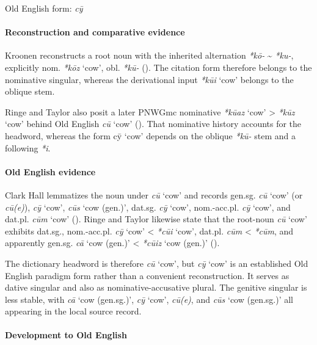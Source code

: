 \documentclass[
  british,
  a4paper,
]{article}
\providecommand{\Recon}[1]{\emph{*#1}}
\begin{document}
Old English form: \emph{cȳ}

\paragraph{Reconstruction and comparative
evidence}\label{reconstruction-and-comparative-evidence-120}

Kroonen reconstructs a root noun with the inherited alternation
\emph{*kō-} \textasciitilde{} \emph{*ku-}, explicitly nom.
\emph{\Recon{kōz}} `cow', obl. \emph{*kū-}
(). The citation form
therefore belongs to the nominative singular, whereas the derivational
input \Recon{kūi} `cow' belongs to the oblique stem.

Ringe and Taylor also posit a later PNWGmc nominative \Recon{kūaz} `cow'
\textgreater{} \Recon{kūz} `cow' behind Old English {\emph{cū}} `cow'
().
That nominative history accounts for the headword, whereas the form cȳ
`cow' depends on the oblique \emph{*kū-} stem and a following \emph{*i}.

\paragraph{Old English evidence}\label{old-english-evidence-120}

Clark Hall lemmatizes the noun under {\emph{cū}} `cow' and records
gen.sg. {\emph{cū}} `cow' (or {\emph{cū(e)}}), {\emph{cȳ}} `cow',
{\emph{cūs}} `cow (gen.)', dat.sg. {\emph{cȳ}} `cow', nom.-acc.pl.
{\emph{cȳ}} `cow', and dat.pl. \emph{cūm} `cow'
(). Ringe and Taylor
likewise state that the root-noun {\emph{cū}} `cow' exhibits dat.sg.,
nom.-acc.pl. {\emph{cȳ}} `cow' \textless{} \Recon{cūi} `cow', dat.pl.
\emph{cūm} \textless{} \emph{*cūm}, and apparently gen.sg. {\emph{cā}}
`cow (gen.)' \textless{} \Recon{cūiz} `cow (gen.)'
().

The dictionary headword is therefore {\emph{cū}} `cow', but {\emph{cȳ}}
`cow' is an established Old English paradigm form rather than a
convenient reconstruction. It serves as dative singular and also as
nominative-accusative plural. The genitive singular is less stable, with
{\emph{cā}} `cow (gen.sg.)', {\emph{cȳ}} `cow', \emph{cū(e)}, and
{\emph{cūs}} `cow (gen.sg.)' all appearing in the local source record.

\paragraph{Development to Old
English}\label{development-to-old-english-120}
\end{document}
